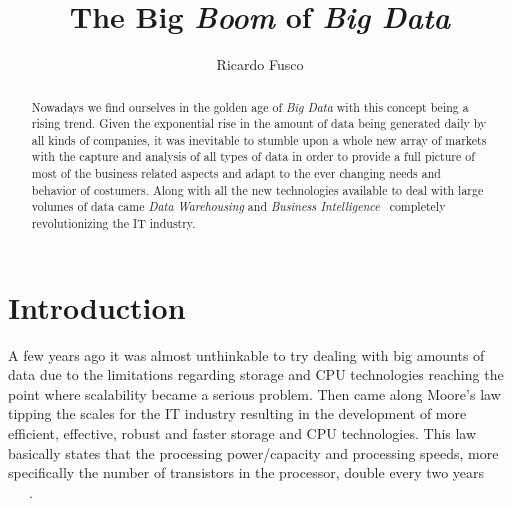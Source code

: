 \documentclass{llncs}
\begin{document}
\title{%
The Big \textit{Boom} of \textit{Big Data}  %
}

\author{%
Ricardo Fusco}


\date{}


\maketitle{}

\begin{abstract}
Nowadays we find ourselves in the golden age of \textit{Big Data} with this concept being a rising trend. Given the exponential rise in the amount of data being generated daily by all kinds of companies, it was inevitable to stumble upon a whole new array of markets with the capture and analysis of all types of data in order to provide a full picture of most of the business related aspects and adapt to the ever changing needs and behavior of costumers. Along with all the new technologies available to deal with large volumes of data came \textit{Data Warehousing} and \textit{Business Intelligence}~\cite{Chen2012} completely revolutionizing the IT industry.

\end{abstract}

\section{Introduction}
A few years ago it was almost unthinkable to try dealing with big amounts of data due to the limitations regarding storage and CPU technologies reaching the point where scalability became a serious problem. Then came along Moore's law tipping the scales for the IT industry resulting in the development of more efficient, effective, robust and faster storage and CPU technologies. This law basically states that the processing power/capacity and processing speeds, more specifically the number of transistors in the processor, double every two years ~\cite{mooreslaw}~\cite{Shaw2014}~\cite{Russom2011}. 
\end{document}

